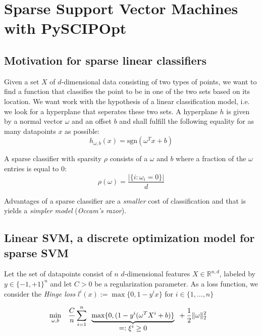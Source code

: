 \documentclass[12pt]{article}
\newcommand\abs[1]{\left|#1\right|}
\newcommand{\R}{\mathbb{R}}
\begin{document}
\section*{Sparse Support Vector Machines with PySCIPOpt}

\subsection*{Motivation for sparse linear classifiers}

Given a set $X$ of $d$-dimensional data consisting of two types of points, we want to find a function that classifies the point to be in one of the two sets based on its location.
We want work with the hypothesis of a linear classification model, i.e. we look for a hyperplane that seperates these two sets.
A hyperplane $h$ is given by a normal vector $\omega$ and an offset $b$ and shall fulfill the following equality for as many datapoints $x$ as possible:
$$ h_{\omega, b}(x) = \text{sgn} (\omega^{T}x + b) $$

A sparse classifier with sparsity $\rho$ consists of a $\omega$ and $b$ where a fraction of the $\omega$ entries is equal to 0:
$$ \rho(\omega) = \frac{\abs{\{ i \colon \omega_{i} = 0 \}}}{d} $$

Advantages of a sparse classifier are a \emph{smaller} cost of classification and that is yields a \emph{simpler model} (\emph{Occam's razor}).

\subsection*{Linear SVM, a discrete optimization model for sparse SVM}

Let the set of datapoints consist of $n$ $d$-dimensional features $X \in \R^{n,d}$, labeled by $y \in \{-1,+1\}^{n}$ and let $C > 0$ be a regularization parameter.
As a loss function, we consider the \emph{Hinge loss}
$l^{i}(x) :=  \max \{0, 1 - y^{i}x\}$ for $i \in \{1,\dots, n\}$

\begin{equation*} \begin{aligned}
  & \min\limits_{\omega, b}
  & & \frac{C}{n} \sum\limits_{i = 1}^{n}
  \begin{array}[t]{c}
    \underbrace{\max\{0, (1 - y^{i} (\omega^{T}X^{i} + b)\}}\\
          =: \xi^{i} \geq 0
  \end{array}
  +\frac{1}{2} \lVert \omega \rVert_{2}^{2}
\end{aligned} \end{equation*}
\end{document}
